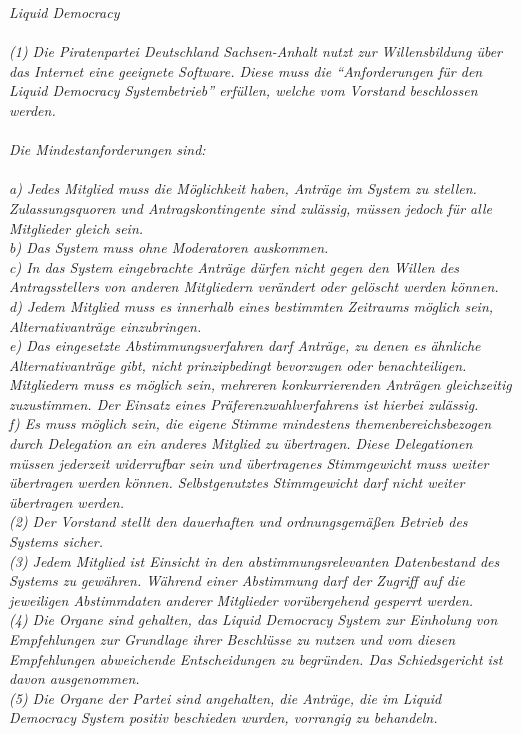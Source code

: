 \textit{Liquid Democracy\\\\
(1) Die Piratenpartei Deutschland Sachsen-Anhalt nutzt zur Willensbildung über das Internet eine geeignete Software. Diese muss die “Anforderungen für den Liquid Democracy Systembetrieb” erfüllen, welche vom Vorstand beschlossen werden.\\\\
Die Mindestanforderungen sind:\\\\
a) Jedes Mitglied muss die Möglichkeit haben, Anträge im System zu stellen. Zulassungsquoren und Antragskontingente sind zulässig, müssen jedoch für alle Mitglieder gleich sein.\\
b) Das System muss ohne Moderatoren auskommen.\\
c) In das System eingebrachte Anträge dürfen nicht gegen den Willen des Antragsstellers von anderen Mitgliedern verändert oder gelöscht werden können.\\
d) Jedem Mitglied muss es innerhalb eines bestimmten Zeitraums möglich sein, Alternativanträge einzubringen.\\
e) Das eingesetzte Abstimmungsverfahren darf Anträge, zu denen es ähnliche Alternativanträge gibt, nicht prinzipbedingt bevorzugen oder benachteiligen. Mitgliedern muss es möglich sein, mehreren konkurrierenden Anträgen gleichzeitig zuzustimmen. Der Einsatz eines Präferenzwahlverfahrens ist hierbei zulässig.\\
f) Es muss möglich sein, die eigene Stimme mindestens themenbereichsbezogen durch Delegation an ein anderes Mitglied zu übertragen. Diese Delegationen müssen jederzeit widerrufbar sein und übertragenes Stimmgewicht muss weiter übertragen werden können. Selbstgenutztes Stimmgewicht darf nicht weiter übertragen werden.\\
(2) Der Vorstand stellt den dauerhaften und ordnungsgemäßen Betrieb des Systems sicher.\\
(3) Jedem Mitglied ist Einsicht in den abstimmungsrelevanten Datenbestand des Systems zu gewähren. Während einer Abstimmung darf der Zugriff auf die jeweiligen Abstimmdaten anderer Mitglieder vorübergehend gesperrt werden.\\
(4) Die Organe sind gehalten, das Liquid Democracy System zur Einholung von Empfehlungen zur Grundlage ihrer Beschlüsse zu nutzen und vom diesen Empfehlungen abweichende Entscheidungen zu begründen. Das Schiedsgericht ist davon ausgenommen.\\
(5) Die Organe der Partei sind angehalten, die Anträge, die im Liquid Democracy System positiv beschieden wurden, vorrangig zu behandeln.\\
}
